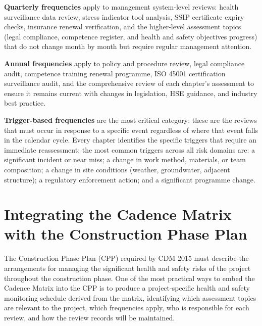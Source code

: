 \textbf{Quarterly frequencies} apply to management system-level reviews: health surveillance data review, stress indicator tool analysis, SSIP certificate expiry checks, insurance renewal verification, and the higher-level assessment topics (legal compliance, competence register, and health and safety objectives progress) that do not change month by month but require regular management attention.

\textbf{Annual frequencies} apply to policy and procedure review, legal compliance audit, competence training renewal programme, ISO 45001 certification surveillance audit, and the comprehensive review of each chapter's assessment to ensure it remains current with changes in legislation, HSE guidance, and industry best practice.

\textbf{Trigger-based frequencies} are the most critical category: these are the reviews that must occur in response to a specific event regardless of where that event falls in the calendar cycle. Every chapter identifies the specific triggers that require an immediate reassessment; the most common triggers across all risk domains are: a significant incident or near miss; a change in work method, materials, or team composition; a change in site conditions (weather, groundwater, adjacent structure); a regulatory enforcement action; and a significant programme change.

\section*{Integrating the Cadence Matrix with the Construction Phase Plan}

The Construction Phase Plan (CPP) required by CDM 2015 must describe the arrangements for managing the significant health and safety risks of the project throughout the construction phase. One of the most practical ways to embed the Cadence Matrix into the CPP is to produce a project-specific health and safety monitoring schedule derived from the matrix, identifying which assessment topics are relevant to the project, which frequencies apply, who is responsible for each review, and how the review records will be maintained.

